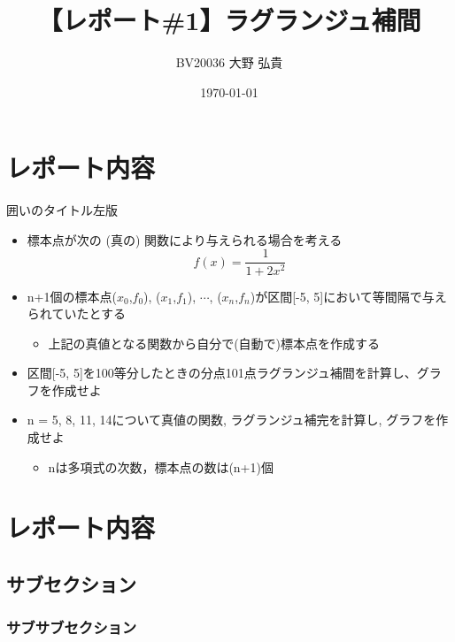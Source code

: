 \documentclass[titlepage, a4paper, 11pt, dvipdfmx]{jsarticle}
\title{\Huge【レポート\#1】ラグランジュ補間}%
\date{\today}%
\author{\Large BV20036 \quad 大野 弘貴}%
\begin{document}
\maketitle
{}
\newpage
{}


\section{レポート内容}
\begin{itembox}[l]{囲いのタイトル左版}
    \begin{itemize}
        \item 標本点が次の (真の) 関数により与えられる場合を考える\\
      $$ f(x)=\frac{1}{1+2x^2} $$
        \item n+1個の標本点($x_0$,$f_0$), ($x_1$,$f_1$), $ \cdots $, ($x_n$,$f_n$)が区間[-5, 5]において等間隔で与えられていたとする
        \begin{itemize}
            \item 上記の真値となる関数から自分で(自動で)標本点を作成する
        \end{itemize} 
        \item 区間[-5, 5]を100等分したときの分点101点ラグランジュ補間を計算し、グラフを作成せよ
        \item n = 5, 8, 11, 14について真値の関数, ラグランジュ補完を計算し, グラフを作成せよ
        \begin{itemize}
            \item nは多項式の次数，標本点の数は(n+1)個
        \end{itemize} 
  \end{itemize}
    \end{itembox}
    \section{レポート内容}
\subsection{サブセクション}
\subsubsection{サブサブセクション}
\end{document}
